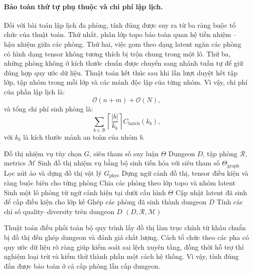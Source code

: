 \documentclass[oneside,a4paper,12pt]{extreport}
\begin{document}
\paragraph{Bảo toàn thứ tự phụ thuộc và chi phí lập lịch.}
Đối với bài toán lập lịch đa phòng, tính đúng được suy ra từ ba ràng buộc tổ
chức của thuật toán. Thứ nhất, phân lớp topo bảo toàn quan hệ tiền nhiệm --
hậu nhiệm giữa các phòng. Thứ hai, việc gom theo dạng latent ngăn các phòng có
hình dạng tensor không tương thích bị trộn chung trong một lô. Thứ ba, những
phòng không ở kích thước chuẩn được chuyển sang nhánh tuần tự để giữ đúng hợp
quy ước dữ liệu. Thuật toán kết thúc sau khi lần lượt duyệt hết tập lớp, tập nhóm
trong mỗi lớp và các mảnh độc lập của từng nhóm. Vì vậy, chi phí của phần lập
lịch là:
\begin{equation}
\mathcal{O}(n+m)+\mathcal{O}(N),
\end{equation}
và tổng chi phí sinh phòng là:
\begin{equation}
\sum_{b\in\mathcal{B}} \left\lceil\frac{|b|}{k_b}\right\rceil C_{\text{batch}}(k_b),
\end{equation}
với $k_b$ là kích thước mảnh an toàn của nhóm $b$.

\begin{algorithm}[H]
\caption{Suy luận dungeon theo quy trình lấy đồ thị làm trung tâm}
\label{alg:generate_dungeon_graph_first}
\begin{algorithmic}[1]
\Require Đồ thị nhiệm vụ tùy chọn $G$, siêu tham số suy luận $\Theta$
\Ensure Dungeon $D$, tập phòng $\mathcal{R}$, metrics $\mathcal{M}$
  \State Sinh đồ thị nhiệm vụ bằng bộ sinh tiến hóa với siêu tham số $\Theta_{\text{graph}}$
\EndIf
\State Lọc nút ảo và dựng đồ thị vật lý $G_{\text{phys}}$
\State Dựng ngữ cảnh đồ thị, tensor điều kiện và ràng buộc biên cho từng phòng
\State Chia các phòng theo lớp topo và nhóm latent
  \State Sinh một lô phòng từ ngữ cảnh hiện tại dưới cấu hình $\Theta$
  \State Cập nhật latent đã sinh để cấp điều kiện cho lớp kế
\EndFor
\State Ghép các phòng đã sinh thành dungeon $D$
  \State Tính các chỉ số quality--diversity trên dungeon $D$
\EndIf
\State \Return $(D,\mathcal{R},\mathcal{M})$
\end{algorithmic}
\end{algorithm}

Thuật toán điều phối toàn bộ quy trình lấy đồ thị làm trục chính từ khâu chuẩn bị đồ thị đến ghép dungeon và đánh giá chất lượng. Cách tổ chức theo các pha có quy ước dữ liệu rõ ràng giúp kiểm soát sai lệch xuyên tầng, đồng thời hỗ trợ thí nghiệm loại trừ và kiểm thử thành phần một cách hệ thống. Vì vậy, tính đúng đắn được bảo toàn ở cả cấp phòng lẫn cấp dungeon.
\end{document}

